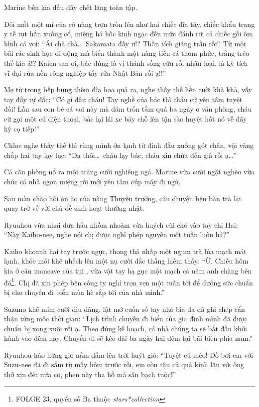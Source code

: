 \documentclass[../main.tex]{subfiles}
\begin{document}
Marine bên kia đầu dây chết lặng toàn tập.

Đôi mắt một mí của cô nàng trợn tròn lên như hai chiếc đĩa tây, chiếc khẩu trang y tế tụt hẳn xuống cổ, miệng há hốc kinh ngạc đến mức đánh rơi cả chiếc gối ôm hình cá voi: ``Ái chà chà\dots\ Sakamata đấy ư!? Thần tích giáng trần rồi!! Từ một bãi rác sinh học di động mà biến thành một nàng tiên cá thơm phức, trắng trẻo thế kia á!? Kaien-san ơi, bác đúng là vị thánh sống cứu rỗi nhân loại, là kỳ tích vĩ đại của nền công nghiệp tẩy rửa Nhật Bản rồi ạ!!''

Mẹ từ trong bếp bưng thêm đĩa hoa quả ra, nghe thấy thế liền cười khà khà, vẫy tay đầy tự đắc: ``Có gì đâu cháu! Tay nghề của bác thì cháu cứ yên tâm tuyệt đối! Lần sau con bé cá voi này mà dám trốn tắm quá ba ngày ở văn phòng, cháu cứ gọi một cú điện thoại, bác lại lái xe bảy chỗ lên tận sào huyệt hốt nó về đây kỳ cọ tiếp!''

Chloe nghe thấy thế thì rùng mình ớn lạnh từ đỉnh đầu xuống gót chân, vội vàng chắp hai tay lạy lục: ``Dạ thôi\dots\ cháu lạy bác, cháu xin chừa đến già rồi ạ\dots''

Cả căn phòng nổ ra một tràng cười nghiêng ngả. Marine vừa cười ngặt nghẽo vừa chúc cả nhà ngon miệng rồi mới yên tâm cúp máy đi ngủ.

Sau màn chào hỏi ồn ào của nàng Thuyền trưởng, câu chuyện bên bàn trà lại quay trở về với chủ đề sinh hoạt thường nhật.

Ryuuhou vừa nhai dưa hấu nhồm nhoàm vừa huých cùi chỏ vào tay chị Hai: ``Này Kaiho-nee, nghe nói chị được nghỉ phép nguyên một tuần luôn hả?''

Kaiho khoanh hai tay trước ngực, thong thả nhấp một ngụm trà lúa mạch mát lạnh, khóe môi khẽ nhếch lên một nụ cười đắc thắng hiếm thấy: ``Ừ. Chiều hôm kia ở căn mancave của tụi \hls, vừa vật tay hạ gục một mạch cả năm anh chàng bên đó\footnote{{\humanist FOLGE 23}, quyển số Ba thuộc \textit{stars*collection}}. Chị đã xin phép bên công ty nghỉ trọn vẹn một tuần tới để dưỡng sức chuẩn bị cho chuyến đi biển mùa hè sắp tới của nhà mình.''

Suzuno khẽ mỉm cười dịu dàng, lật mở cuốn sổ tay nhỏ bìa da đã ghi chép cẩn thận từng mốc thời gian: ``Lịch trình chuyến đi biển của gia đình mình đã được chuẩn bị xong xuôi rồi ạ. Theo đúng kế hoạch, cả nhà chúng ta sẽ bắt đầu khởi hành vào đêm nay. Chuyến đi sẽ kéo dài ba ngày hai đêm tại bãi biển phía nam.''

Ryuuhou hào hứng giơ nắm đấm lên trời huýt gió: ``Tuyệt cú mèo! Đồ bơi em với Suzu-nee đã đi sắm từ mấy hôm trước rồi, em còn tậu cả quả kính lặn với ống thở xịn đét nữa cơ, phen này tha hồ mà săn bạch tuộc!''
\end{document}
